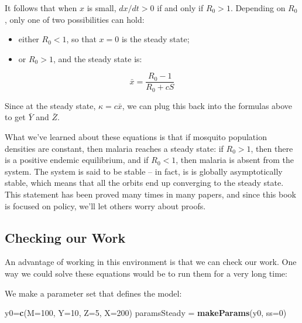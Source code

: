 \documentclass[
]{book}
\newenvironment{Shaded}{\begin{snugshade}}{\end{snugshade}}
\newcommand{\AttributeTok}[1]{\textcolor[rgb]{0.13,0.29,0.53}{#1}}
\newcommand{\DecValTok}[1]{\textcolor[rgb]{0.00,0.00,0.81}{#1}}
\newcommand{\FunctionTok}[1]{\textcolor[rgb]{0.13,0.29,0.53}{\textbf{#1}}}
\newcommand{\NormalTok}[1]{#1}
\newcommand{\OtherTok}[1]{\textcolor[rgb]{0.56,0.35,0.01}{#1}}
\begin{document}
It follows that when \(x\) is small, \(dx/dt>0\) if and only if \(R_0 > 1\). Depending on \(R_0\), only one of two possibilities can hold:

\begin{itemize}
\item
  either \(R_0<1\), so that \(x=0\) is the steady state;
\item
  or \(R_0 > 1\), and the steady state is:
\end{itemize}

\begin{equation}
\bar x = \frac{R_0 -1}{R_0 + c S} 
\end{equation}

Since at the steady state, \(\kappa = c \bar x\), we can plug this back into the formulas above to get \(\bar Y\) and \(\bar Z\).

What we've learned about these equations is that if mosquito population densities are constant, then malaria reaches a steady state: if \(R_0 >1\), then there is a positive endemic equilibrium, and if \(R_0 < 1\), then malaria is absent from the system. The system is said to be stable -- in fact, is is globally asymptotically stable, which means that all the orbits end up converging to the steady state. This statement has been proved many times in many papers, and since this book is focused on policy, we'll let others worry about proofs.

\hypertarget{checking-our-work}{%
\subsection{Checking our Work}\label{checking-our-work}}

An advantage of working in this environment is that we can check our work. One way we could solve these equations would be to run them for a very long time:

We make a parameter set that defines the model:

\begin{Shaded}
\begin{Highlighting}[]
\NormalTok{y0}\OtherTok{=}\FunctionTok{c}\NormalTok{(}\AttributeTok{M=}\DecValTok{100}\NormalTok{, }\AttributeTok{Y=}\DecValTok{10}\NormalTok{, }\AttributeTok{Z=}\DecValTok{5}\NormalTok{, }\AttributeTok{X=}\DecValTok{200}\NormalTok{)}
\NormalTok{paramsSteady }\OtherTok{=} \FunctionTok{makeParams}\NormalTok{(y0, }\AttributeTok{ss=}\DecValTok{0}\NormalTok{)}
\end{Highlighting}
\end{Shaded}
\end{document}
